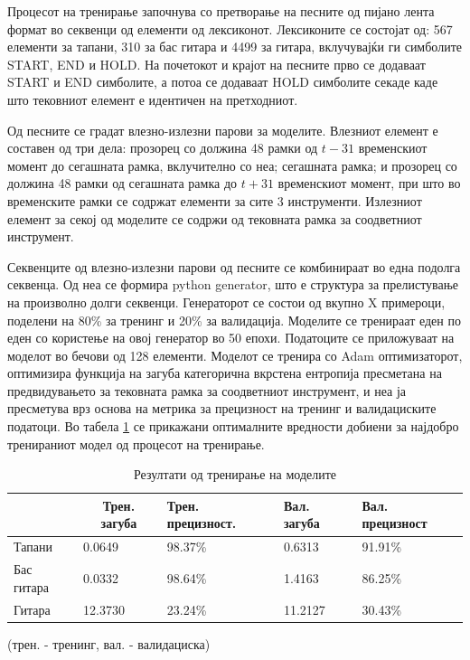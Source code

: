 Процесот на тренирање започнува со претворање на песните од пијано лента формат во секвенци од елементи од лексиконот. Лексиконите се состојат од: 567 елементи за тапани, 310 за бас гитара и 4499 за гитара, вклучувајќи ги симболите START, END и HOLD. На почетокот и крајот на песните прво се додаваат  START и END симболите, а потоа се додаваат HOLD симболите секаде каде што тековниот елемент е идентичен на претходниот. 

Од песните се градат влезно-излезни парови за моделите. Влезниот елемент е составен од три дела: прозорец со должина 48 рамки од $t-31$ временскиот момент до сегашната рамка, вклучително со неа; сегашната рамка; и прозорец со должина 48 рамки од сегашната рамка до $t+31$ временскиот момент, при што во временските рамки се содржат елементи за сите 3 инструменти. Излезниот елемент за секој од моделите се содржи од тековната рамка за соодветниот инструмент.

Секвенците од влезно-излезни парови од песните се комбинираат во една подолга секвенца. Од неа се формира python generator, што е структура за прелистување на произволно долги секвенци. Генераторот се состои од вкупно X примероци, поделени на 80\% за тренинг и 20\% за валидација. Моделите се тренираат еден по еден со користење на овој генератор во 50 епохи. Податоците се приложуваат на моделот во бечови од 128 елементи. Моделот се тренира со Adam оптимизаторот, оптимизира функција на загуба категорична вкрстена ентропија пресметана на предвидувањето за тековната рамка за соодветниот инструмент, и неа ја пресметува врз основа на метрика за прецизност на тренинг и валидациските податоци. Во табела \ref{tab:trening} се прикажани оптималните вредности добиени за најдобро тренираниот модел од процесот на тренирање.

\begin{table}[H]
\centering
\begin{tabular}{@{}lllll@{}}
\toprule
           & \multicolumn{1}{c}{Трен. загуба} & Трен. прецизност. & Вал. загуба & Вал. прецизност                   \\ \midrule
Тапани          &   0.0649              &  98.37\%              &  0.6313               &    91.91\%    \\
Бас гитара      &   0.0332              &  98.64\%              &  1.4163               &    86.25\%    \\
Гитара          &   12.3730             &  23.24\%              &  11.2127              &    30.43\%    \\ \bottomrule
\end{tabular}
\caption{Резултати од тренирање на моделите}
(трен. - тренинг, вал. - валидациска)
\label{tab:trening}
\end{table}

